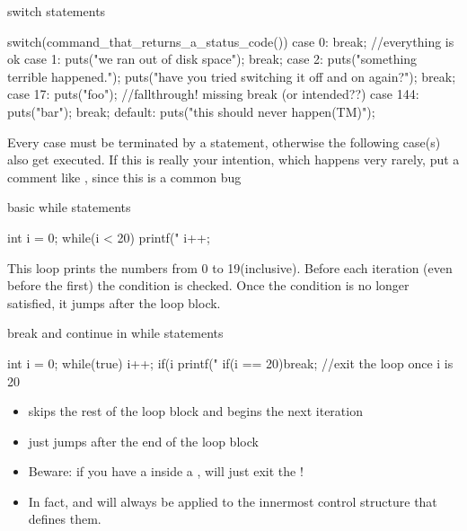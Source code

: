\documentclass[10pt,graphics,aspectratio=169,table]{beamer}
\begin{document}
\begin{frame}[fragile]{switch statements}
    \begin{codeblock}
switch(command_that_returns_a_status_code()){
    case 0: break; //everything is ok
    case 1: puts("we ran out of disk space"); break;
    case 2: {
        puts("something terrible happened.");
        puts("have you tried switching it off and on again?");
    }break;
    case 17: puts("foo"); //fallthrough! missing break (or intended??)
    case 144: puts("bar"); break;
    default: puts("this should never happen(TM)");
}
    \end{codeblock}
    Every case must be terminated by a  statement, otherwise the
    following case(s) also get executed. If this is really your intention,
    which happens very rarely, put a comment like ,
    since this is a common bug
\end{frame}

\begin{frame}[fragile]{basic while statements}
    \begin{codeblock}
int i = 0;
while(i < 20){
    printf("%
    i++;
}
    \end{codeblock}

    This loop prints the numbers from 0 to 19(inclusive).
    Before each iteration (even before the first) the condition is checked.
    Once the condition is no longer satisfied, it jumps after the loop block.
\end{frame}
\begin{frame}[fragile]{break and continue in while statements}
    \begin{codeblock}
int i = 0;
while(true){
    i++;
    if(i %
    printf("%
    if(i == 20)break; //exit the loop once i is 20
}
    \end{codeblock}
    \begin{itemize}
        \item
             skips the rest of the loop block and begins
            the next iteration
        \item {} just jumps after the end of the loop block
        \item
            Beware: if you have a  inside a ,
             will just exit the !
        \item
            In fact,  and  will always be applied to
            the innermost control structure that defines them.
    \end{itemize}
\end{frame}
\end{document}
